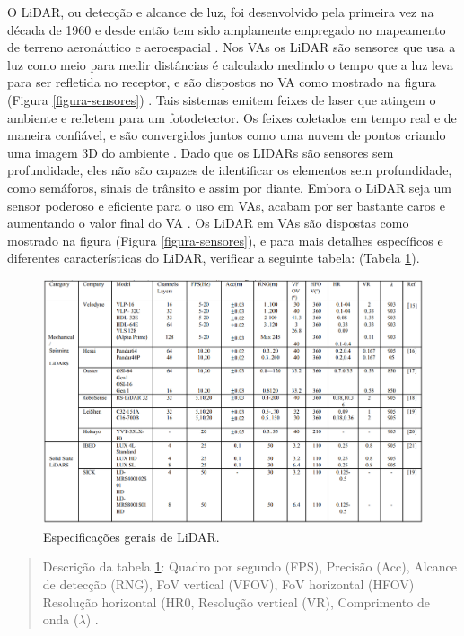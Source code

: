 O LiDAR, ou detecção e alcance de luz, foi desenvolvido pela primeira vez na década de 1960 e desde então tem sido amplamente empregado no mapeamento de terreno aeronáutico e aeroespacial \cite{sensors}. Nos VAs os LiDAR são sensores que usa a luz como meio para medir distâncias é calculado medindo o tempo que a luz leva para ser refletida no receptor, e são dispostos no VA como mostrado na figura (Figura \ref{figura-sensores}) . Tais sistemas emitem feixes de laser que atingem o ambiente e refletem para um fotodetector. Os feixes coletados em tempo real e de maneira confiável, e  são convergidos juntos como uma nuvem de pontos criando uma imagem 3D do ambiente \cite{aplicacao2}. Dado que os LIDARs são sensores sem profundidade, eles não são capazes de identificar os elementos sem profundidade, como semáforos, sinais de trânsito e assim por diante.
Embora o LiDAR seja um sensor poderoso e eficiente para o uso em VAs, acabam por ser  bastante caros e aumentando o valor final do VA \cite{review-auto}. 
Os LiDAR em VAs são dispostas como mostrado na figura (Figura \ref{figura-sensores}), e para mais detalhes específicos e diferentes características do LiDAR, verificar a seguinte tabela: (Tabela \ref{tabela-lidar}).

\begin{figure}[H]
\centering
\includegraphics[width=\textwidth]{Figures/lidar-table.png}
\caption{Especificações gerais de LiDAR.}
\label{tabela-lidar}
\end{figure}

\begin{quote}
Descrição da tabela \ref{tabela-lidar}: Quadro por segundo (FPS), Precisão (Acc), Alcance de detecção (RNG), FoV vertical (VFOV), FoV horizontal (HFOV) Resolução horizontal (HR0, Resolução vertical (VR), Comprimento de onda ($\lambda$) \cite{sensors}.
\end{quote}


